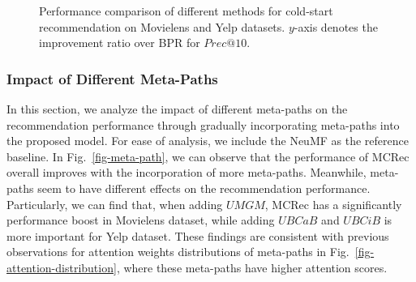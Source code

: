 \begin{figure}[htbp]
\centering
{}
\caption{Performance comparison of different methods for cold-start recommendation on Movielens and Yelp datasets. $y$-axis denotes the improvement ratio over BPR for $Prec@10$.\label{fig-coldstart}}
\end{figure}



\subsubsection{Impact of Different Meta-Paths}
In this section, we analyze the impact of different meta-paths on the recommendation performance through gradually incorporating meta-paths into the proposed model. For ease of analysis, we include the NeuMF as the reference baseline. In Fig.~\ref{fig-meta-path}, we can observe that  the performance of MCRec overall improves with the incorporation of more meta-paths. Meanwhile, meta-paths seem to have different effects on the recommendation performance. Particularly, we can find that, when adding $UMGM$, MCRec has a significantly performance boost in Movielens dataset, while adding $UBCaB$ and $UBCiB$ is more important for Yelp dataset. These findings are consistent with previous observations for attention weights distributions of meta-paths in Fig.~\ref{fig-attention-distribution}, where these meta-paths have higher attention scores.

